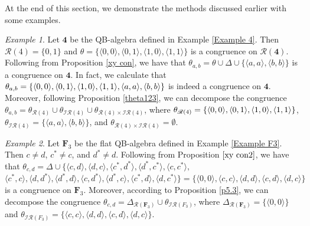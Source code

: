 \documentclass[12pt]{amsart}
\theoremstyle{definition}
\theoremstyle{remark}
\newtheorem{example}{Example}[section]
\numberwithin{equation}{section}
\begin{document}
At the end of this section, we demonstrate the methods discussed earlier with some examples.

\begin{example}\label{exa 4break}
Let $\mathbf{4}$ be the QB-algebra defined in Example \ref{Example 4}. Then $\mathscr{R}(4)=\{0,1\}$ and $\theta=\{\langle0,0\rangle,\langle0,1\rangle, \langle1,0\rangle,\langle1,1\rangle\}$ is a congruence on $\mathscr{R}(\mathbf{4})$. Following from Proposition \ref{xy con}, we have that $\theta_{a,b}=\theta \cup \Delta \cup \{\langle a,a\rangle, \langle b,b\rangle \}$ is a congruence on $\mathbf{4}$. In fact, we calculate that $\theta_{a,b}=\{\langle0,0\rangle,\langle0,1\rangle, \langle1,\\ 0\rangle,\langle1,1\rangle,\langle a,a\rangle, \langle b,b\rangle \}$ is indeed a congruence on $\mathbf{4}$. Moreover, following Proposition \ref{theta123}, we can decompose the congruence $\theta_{a,b}=\theta_{\mathscr{R}(4)}\cup\theta_{\mathscr{IR}(4)}\cup\theta_{\mathscr{R}(4)\times \mathscr{IR}(4)}$, where $\theta_{\mathscr{R}(4)}=\{\langle0,0\rangle,\langle0,1\rangle, \langle1,0\rangle,\\ \langle1,1\rangle\}$, $\theta_{\mathscr{IR}(4)}=\{\langle a,a\rangle, \langle b,b\rangle\}$, and
$\theta_{\mathscr{R}(4)\times \mathscr{IR}(4)}=\emptyset$.
\end{example}

\begin{example}
Let $\mathbf{F}_{3}$ be the flat QB-algebra defined in Example \ref{Example F3}. Then $c\neq d$, $c^{\ast}\neq c$, and $d^{\ast}\neq d$.
Following from Proposition $\ref{xy con2}$,  we have that $\theta_{c,d}=\Delta\cup \{\langle c,d\rangle, \langle d,c\rangle, \langle c^{\ast},d^{\ast}\rangle, \langle d^{\ast},c^{\ast}\rangle,\langle c,c^{\ast}\rangle,$ $\langle c^{\ast},c\rangle,\langle d,d^{\ast}\rangle,\langle d^{\ast},d\rangle,\langle c,d^{\ast}\rangle, \langle d^{\ast},c\rangle,\langle c^{\ast},d\rangle,\langle d,c^{\ast}\rangle \}=\{\langle0,0\rangle,\langle c,c\rangle, \langle d,d\rangle, \langle c,d\rangle,\langle d,c\rangle\}$ is a congruence on $\mathbf{F}_{3}$. Moreover, according to Proposition \ref{p5.3}, we can decompose the congruence $\theta_{c,d}=\Delta_{\mathscr{R}(\mathbf{F}_{3})}\cup \theta_{\mathscr{IR}(F_{3})}$, where $\Delta_{\mathscr{R}(\mathbf{F}_{3})}=\{\langle0,0\rangle\}$ and $\theta_{\mathscr{IR}(F_{3})}=\{\langle c,c\rangle, \langle d,d\rangle,\langle c,d\rangle, \langle d,c\rangle\}$.
\end{example}
\end{document}
